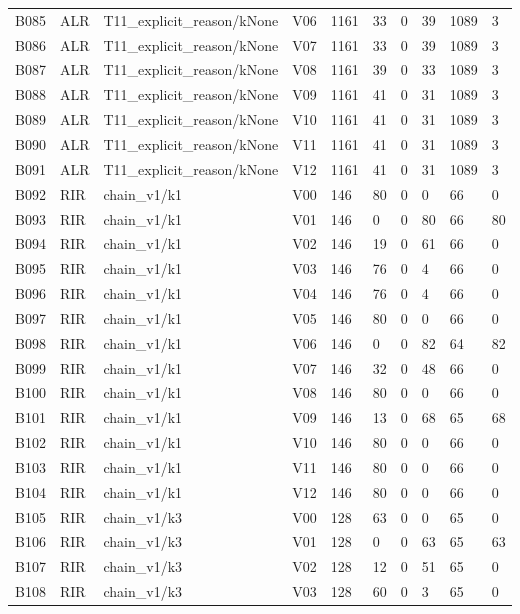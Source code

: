 \begin{longtable}{llllllllll}
B085 & ALR & T11\_explicit\_reason/kNone & V06 & 1161 & 33 & 0 & 39 & 1089 & 3 \\
B086 & ALR & T11\_explicit\_reason/kNone & V07 & 1161 & 33 & 0 & 39 & 1089 & 3 \\
B087 & ALR & T11\_explicit\_reason/kNone & V08 & 1161 & 39 & 0 & 33 & 1089 & 3 \\
B088 & ALR & T11\_explicit\_reason/kNone & V09 & 1161 & 41 & 0 & 31 & 1089 & 3 \\
B089 & ALR & T11\_explicit\_reason/kNone & V10 & 1161 & 41 & 0 & 31 & 1089 & 3 \\
B090 & ALR & T11\_explicit\_reason/kNone & V11 & 1161 & 41 & 0 & 31 & 1089 & 3 \\
B091 & ALR & T11\_explicit\_reason/kNone & V12 & 1161 & 41 & 0 & 31 & 1089 & 3 \\
B092 & RIR & chain\_v1/k1 & V00 & 146 & 80 & 0 & 0 & 66 & 0 \\
B093 & RIR & chain\_v1/k1 & V01 & 146 & 0 & 0 & 80 & 66 & 80 \\
B094 & RIR & chain\_v1/k1 & V02 & 146 & 19 & 0 & 61 & 66 & 0 \\
B095 & RIR & chain\_v1/k1 & V03 & 146 & 76 & 0 & 4 & 66 & 0 \\
B096 & RIR & chain\_v1/k1 & V04 & 146 & 76 & 0 & 4 & 66 & 0 \\
B097 & RIR & chain\_v1/k1 & V05 & 146 & 80 & 0 & 0 & 66 & 0 \\
B098 & RIR & chain\_v1/k1 & V06 & 146 & 0 & 0 & 82 & 64 & 82 \\
B099 & RIR & chain\_v1/k1 & V07 & 146 & 32 & 0 & 48 & 66 & 0 \\
B100 & RIR & chain\_v1/k1 & V08 & 146 & 80 & 0 & 0 & 66 & 0 \\
B101 & RIR & chain\_v1/k1 & V09 & 146 & 13 & 0 & 68 & 65 & 68 \\
B102 & RIR & chain\_v1/k1 & V10 & 146 & 80 & 0 & 0 & 66 & 0 \\
B103 & RIR & chain\_v1/k1 & V11 & 146 & 80 & 0 & 0 & 66 & 0 \\
B104 & RIR & chain\_v1/k1 & V12 & 146 & 80 & 0 & 0 & 66 & 0 \\
B105 & RIR & chain\_v1/k3 & V00 & 128 & 63 & 0 & 0 & 65 & 0 \\
B106 & RIR & chain\_v1/k3 & V01 & 128 & 0 & 0 & 63 & 65 & 63 \\
B107 & RIR & chain\_v1/k3 & V02 & 128 & 12 & 0 & 51 & 65 & 0 \\
B108 & RIR & chain\_v1/k3 & V03 & 128 & 60 & 0 & 3 & 65 & 0 \\

\end{longtable}
